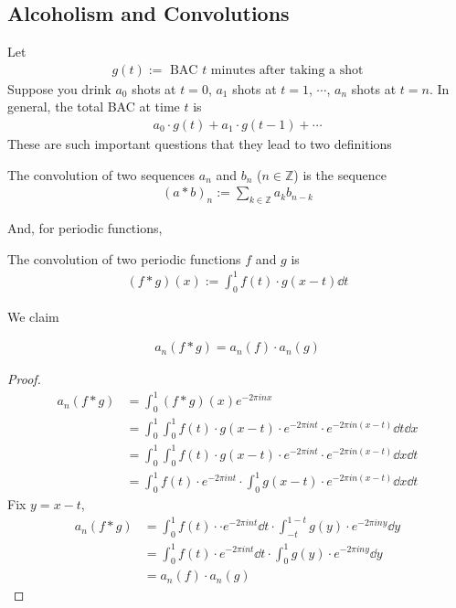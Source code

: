 \subsection{Alcoholism and Convolutions}
Let
\begin{align}
    g(t):= \text{ BAC $t$ minutes after taking a shot}
\end{align}
Suppose you drink $a_0$ shots at $t=0$, $a_1$ shots at $t=1$, $\cdots$, $a_n$ shots at $t=n$. In general, the total BAC at time $t$ is
\begin{align}
    a_0\cdot g(t) + a_1\cdot g(t-1) + \cdots
\end{align}
These are such important questions that they lead to two definitions
\begin{definition}
    The convolution of two sequences $a_n$ and $b_n$ ($n \in \mathbb{Z}$) is the sequence
    \begin{align}
        (a * b)_n := \sum_{k \in \mathbb{Z}} a_k b_{n-k}
    \end{align}
\end{definition}
\noindent And, for periodic functions,
\begin{definition}
    The convolution of two periodic functions $f$ and $g$ is
    \begin{align}
        (f * g)(x) := \int_0^1 f(t)\cdot g(x-t) \dd{t}
    \end{align}
\end{definition}
\noindent We claim
\begin{theorem}
    \begin{align}
        a_n(f * g) = a_n(f) \cdot a_n(g)
    \end{align}
\end{theorem}
\begin{proof}
    \begin{align}
        a_n(f * g) &= \int_0^1 (f*g)(x) e^{-2\pi in x}\\
        &= \int_0^1 \int_0^1 f(t) \cdot g(x-t) \cdot e^{-2\pi in t} \cdot e^{-2\pi in (x-t)} \dd{t} \dd{x}\\
        &= \int_0^1 \int_0^1 f(t) \cdot g(x-t) \cdot e^{-2\pi in t} \cdot e^{-2\pi in (x-t)} \dd{x} \dd{t}\\
        &= \int_0^1 f(t) \cdot e^{-2\pi in t} \cdot \int_0^1 g(x-t)  \cdot e^{-2\pi in (x-t)} \dd{x} \dd{t}
    \end{align}
    Fix $y = x-t$,
    \begin{align}
        a_n(f * g) &= \int_0^1 f(t) \cdot \cdot e^{-2\pi in t} \dd{t} \cdot \int_{-t}^{1-t} g(y)  \cdot e^{-2\pi in y} \dd{y} \\
        &= \int_0^1 f(t) \cdot e^{-2\pi in t} \dd{t} \cdot \int_{0}^{1} g(y) \cdot e^{-2\pi in y} \dd{y}\\
        &= a_n(f) \cdot a_n(g)
    \end{align}
\end{proof}